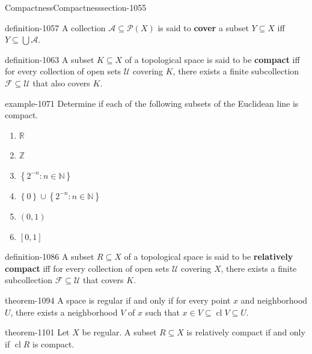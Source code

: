\documentclass[oneside,10pt,]{article}
\newcommand{\terminology}[1]{\textbf{#1}}
\newcommand{\mb}{\mathbb}
\newcommand{\mc}{\mathcal}
\newcommand{\cl}{\operatorname{cl}}
\newcommand{\setBuilder}[2]{\left\{#1:#2\right\}}
\newcommand{\setList}[1]{\left\{#1\right\}}
\begin{document}
\begin{sectionptx}{Compactness}{}{Compactness}{}{}{section-1055}
\begin{definition}{}{definition-1057}%
\hypertarget{p-1058}{}%
A collection \(\mc A\subseteq \mc P(X)\) is said to \terminology{cover} a subset \(Y\subseteq X\) iff \(Y\subseteq\bigcup\mc A\).%
\end{definition}
\begin{definition}{}{definition-1063}%
\hypertarget{p-1064}{}%
A subset \(K\subseteq X\) of a topological space is said to be \terminology{compact} iff for every collection of open sets \(\mc U\) covering \(K\), there exists a finite subcollection \(\mc F\subseteq\mc U\) that also covers \(K\).%
\end{definition}
\begin{example}{}{example-1071}%
\hypertarget{p-1072}{}%
Determine if each of the following subsets of the Euclidean line is compact.%
\leavevmode%
\begin{enumerate}
\item\hypertarget{li-1074}{}\(\mb R\)%
\item\hypertarget{li-1076}{}\(\mb Z\)%
\item\hypertarget{li-1078}{}\(\setBuilder{2^{-n}}{n\in\mb N}\)%
\item\hypertarget{li-1080}{}\(\setList{0}\cup\setBuilder{2^{-n}}{n\in\mb N}\)%
\item\hypertarget{li-1082}{}\((0,1)\)%
\item\hypertarget{li-1084}{}\([0,1]\)%
\end{enumerate}
\end{example}
\begin{definition}{}{definition-1086}%
\hypertarget{p-1087}{}%
A subset \(R\subseteq X\) of a topological space is said to be \terminology{relatively compact} iff for every collection of open sets \(\mc U\) covering \(X\), there exists a finite subcollection \(\mc F\subseteq\mc U\) that covers \(K\).%
\end{definition}
\begin{theorem}{}{}{theorem-1094}%
\hypertarget{p-1095}{}%
A space is regular if and only if for every point \(x\) and neighborhood \(U\), there exists a neighborhood \(V\) of \(x\) such that \(x\in V\subseteq\cl V\subseteq U\).%
\end{theorem}
\begin{theorem}{}{}{theorem-1101}%
\hypertarget{p-1102}{}%
Let \(X\) be regular. A subset \(R\subseteq X\) is relatively compact if and only if \(\cl R\) is compact.%

\end{theorem}
\end{sectionptx}
\end{document}
